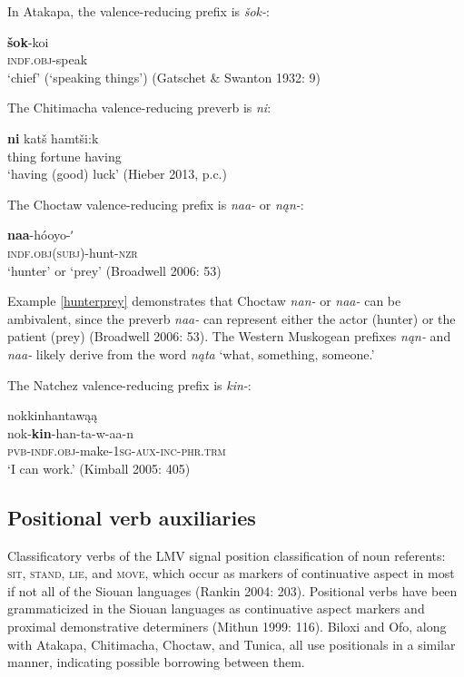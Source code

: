 \documentclass[output=paper]{LSP/langsci}
\begin{document}
	In Atakapa, the valence-reducing prefix is \emph{šok-}:

\ea
\gll	\textbf{šok}-koi\\
		\textsc{indf.obj}-speak \\

\glt	`chief' (`speaking things') (Gatschet \& Swanton 1932: 9)
\z

The Chitimacha valence-reducing preverb is \emph{ni}:

\ea
\gll	\textbf{ni} 	katš hamtši:k \\
	thing fortune having\\

\glt `having (good) luck' (Hieber 2013, p.c.)
\z

	The Choctaw valence-reducing prefix is \emph{naa-} or \emph{nąn-}:
	
\ea\label{hunterprey}
\gll	\textbf{naa}-hóoyo-ʹ~\\
		\textsc{indf.obj(subj)}-hunt-\textsc{nzr}\\
\glt	`hunter' or `prey' (Broadwell 2006: 53)
\z

Example \ref{hunterprey} demonstrates that Choctaw \emph{nan-} or \emph{naa-} can be ambivalent, since the preverb \emph{naa-} can represent either the actor (hunter) or the patient (prey) (Broadwell 2006: 53). The Western Muskogean prefixes \emph{nąn-} and \emph{naa-} likely derive from the word \emph{nąta} `what, something, someone.'
 
	The Natchez valence-reducing prefix is \emph{kin-}:
	
\ea	nokkinhantawąą\\
\gll		nok-\textbf{kin}-han-ta-w-aa-n\\
		\textsc{pvb-indf.obj}-make-\textsc{1sg-aux-inc-phr.trm}\\
\glt	`I can work.' (Kimball 2005: 405)
\z

\subsection{Positional verb auxiliaries}

Classificatory verbs of the LMV signal position classification of noun referents: \textsc{sit}, \textsc{stand}, \textsc{lie}, and \textsc{move}, which occur as markers of continuative aspect in most if not all of the Siouan languages (Rankin 2004: 203). Positional verbs have been grammaticized in the Siouan languages as continuative aspect markers and proximal demonstrative determiners (Mithun 1999: 116). Biloxi and Ofo, along with Atakapa, Chitimacha, Choctaw, and Tunica, all use positionals in a similar manner, indicating possible borrowing between them. 
\end{document}
